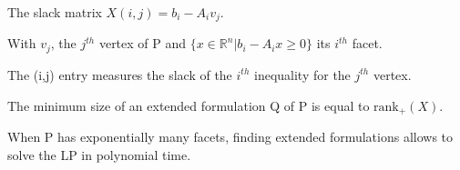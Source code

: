 \begin{frame}
The slack matrix $X(i,j) = b_i-A_iv_j$.

With $v_j$, the $j^{th}$ vertex of P and $\{x\in \mathbb{R}^n | b_i-A_ix\geq 0\}$ its $i^{th}$ facet.

The (i,j) entry measures the slack of the $i^{th}$ inequality for the $j^{th}$ vertex. 
\begin{thm}[Yannakis]
The minimum size of an extended formulation Q of P is equal to $\text{rank}_+(X)$.
\end{thm}

When P has exponentially many facets, finding extended formulations allows to solve the LP in polynomial time.
\end{frame}